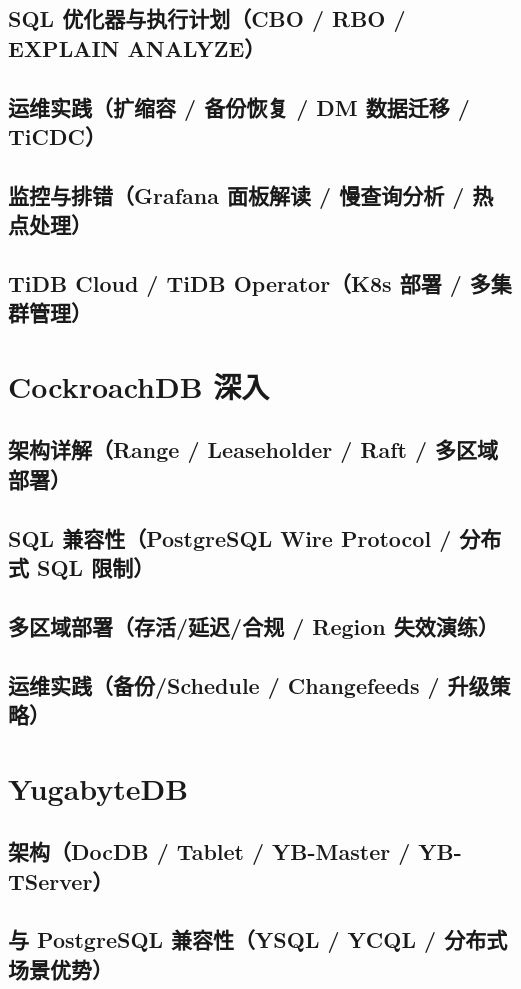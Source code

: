 \documentclass[12pt,UTF8]{ctexbook}
\begin{document}
    \subsection{SQL 优化器与执行计划（CBO / RBO / EXPLAIN ANALYZE）}
    \subsection{运维实践（扩缩容 / 备份恢复 / DM 数据迁移 / TiCDC）}
    \subsection{监控与排错（Grafana 面板解读 / 慢查询分析 / 热点处理）}
    \subsection{TiDB Cloud / TiDB Operator（K8s 部署 / 多集群管理）}

  \section{CockroachDB 深入}
    \subsection{架构详解（Range / Leaseholder / Raft / 多区域部署）}
    \subsection{SQL 兼容性（PostgreSQL Wire Protocol / 分布式 SQL 限制）}
    \subsection{多区域部署（存活/延迟/合规 / Region 失效演练）}
    \subsection{运维实践（备份/Schedule / Changefeeds / 升级策略）}

  \section{YugabyteDB}
    \subsection{架构（DocDB / Tablet / YB-Master / YB-TServer）}
    \subsection{与 PostgreSQL 兼容性（YSQL / YCQL / 分布式场景优势）}
\end{document}
